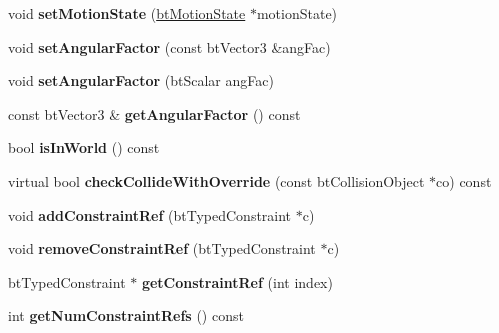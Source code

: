 \begin{DoxyCompactItemize}
\item 
\mbox{\label{classbtRigidBody_ac8272055c40ba4bb794fc5f1cb105d54}} 
void {\bfseries set\+Motion\+State} (\hyperlink{classbtMotionState}{bt\+Motion\+State} $\ast$motion\+State)
\item 
\mbox{\label{classbtRigidBody_aa2061f3fd87043f2a3b8c68ee74847cb}} 
void {\bfseries set\+Angular\+Factor} (const bt\+Vector3 \&ang\+Fac)
\item 
\mbox{\label{classbtRigidBody_acf721bf585c46cf0243cbbda1fc4379d}} 
void {\bfseries set\+Angular\+Factor} (bt\+Scalar ang\+Fac)
\item 
\mbox{\label{classbtRigidBody_ae61bd53cfe8b0987b42d30d470faaf09}} 
const bt\+Vector3 \& {\bfseries get\+Angular\+Factor} () const
\item 
\mbox{\label{classbtRigidBody_aa8030ba8a47ea2c00c990bc4227e1ae2}} 
bool {\bfseries is\+In\+World} () const
\item 
\mbox{\label{classbtRigidBody_a1c036bdfb71afc5b69b16d57c786cca3}} 
virtual bool {\bfseries check\+Collide\+With\+Override} (const bt\+Collision\+Object $\ast$co) const
\item 
\mbox{\label{classbtRigidBody_a1c89df31d2a10f06cc81da0e4b573297}} 
void {\bfseries add\+Constraint\+Ref} (bt\+Typed\+Constraint $\ast$c)
\item 
\mbox{\label{classbtRigidBody_a86e4bf13e7acee4be2c77ed470f44dbe}} 
void {\bfseries remove\+Constraint\+Ref} (bt\+Typed\+Constraint $\ast$c)
\item 
\mbox{\label{classbtRigidBody_abecb7d17ec15d9bec435f9fc7e5962fe}} 
bt\+Typed\+Constraint $\ast$ {\bfseries get\+Constraint\+Ref} (int index)
\item 
\mbox{\label{classbtRigidBody_a868c95d4b4405876cf93d12942b66081}} 
int {\bfseries get\+Num\+Constraint\+Refs} () const
\item 
\mbox{\label{classbtRigidBody_a2756c378b93acd3eb16ee27c183efe9d}} 

\end{DoxyCompactItemize}
